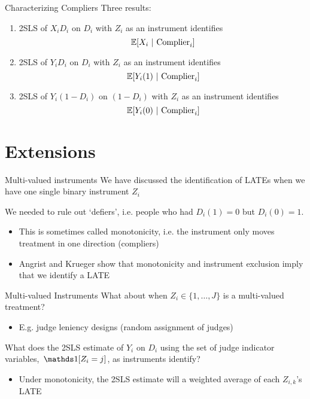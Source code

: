 \documentclass[aspectratio=169,t,11pt,table]{beamer}
\begin{document}
\begin{frame}{Characterizing Compliers}
  Three results:
  \begin{enumerate}
    \item 2SLS of $X_i D_i$ on $D_i$ with $Z_i$ as an instrument identifies
    $$
      \expec{X_i}{\text{Complier}_i}
    $$
    
    \item 2SLS of $Y_i D_i$ on $D_i$ with $Z_i$ as an instrument identifies
    $$
      \expec{Y_i(1)}{\text{Complier}_i}
    $$

    \item 2SLS of $Y_i (1 - D_i)$ on $(1 - D_i)$ with $Z_i$ as an instrument identifies
    $$
      \expec{Y_i(0)}{\text{Complier}_i}
    $$
  \end{enumerate} 
\end{frame}

\section{Extensions}

\begin{frame}{Multi-valued instruments}
  We have discussed the identification of LATEs when we have one single binary instrument $Z_i$
  
  \bigskip
  We needed to rule out `defiers', i.e. people who had $D_i(1) = 0$ but $D_i(0) = 1$. 
  \begin{itemize}
    \item This is sometimes called \alert{monotonicity}, i.e. the instrument only moves treatment in one direction (compliers)
    
    \item Angrist and Krueger show that monotonicity and instrument exclusion imply that we identify a LATE
  \end{itemize}
\end{frame}

\begin{frame}{Multi-valued Instruments}
  What about when $Z_i \in \{1, \dots, J\}$ is a multi-valued treatment?
  \begin{itemize}
    \item E.g. judge leniency designs (random assignment of judges)
  \end{itemize}

  \bigskip
  What does the 2SLS estimate of $Y_i$ on $D_i$ using the set of judge indicator variables, $\one{Z_i = j}$, as instruments identify?
  \begin{itemize}
    \item Under \alert{monotonicity}, the 2SLS estimate will a weighted average of each $Z_{i, k}$'s LATE
  \end{itemize}
\end{frame}
\end{document}
